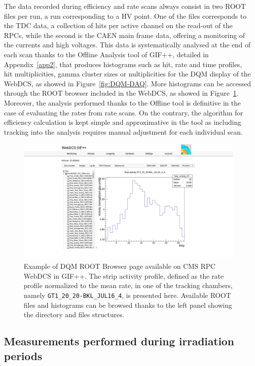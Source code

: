 	The data recorded during efficiency and rate scans always consist in two ROOT files per run, a run corresponding to a HV point. One of the files corresponds to the TDC data, a collection of hits per active channel on the read-out of the RPCs, while the second is the CAEN main frame data, offering a monitoring of the currents and high voltages. This data is systematically analysed at the end of each scan thanks to the Offline Analysis tool of GIF++, detailed in Appendix~\ref{app2}, that produces histograms such as hit, rate and time profiles, hit multiplicities, gamma cluster sizes or nultiplicities for the DQM display of the WebDCS, as showed in Figure~\ref{fig:DQM-DAQ}. More histograms can be accessed through the ROOT browser included in the WebDCS, as showed in Figure~\ref{fig:DQM-ROOT}. Moreover, the analysis performed thanks to the Offline tool is definitive in the case of evaluating the rates from rate scans. On the contrary, the algorithm for efficiency calculation is kept simple and approximative in the tool as including tracking into the analysis requires manual adjustment for each individual scan.

	\begin{figure}[H]
        \centering
		\includegraphics[width = \linewidth]{fig/chapt5/GIFpp-ROOT-browser.png}
		\caption{\label{fig:DQM-ROOT} Example of DQM ROOT Browser page available on CMS RPC WebDCS in GIF++. The strip activity profile, defined as the rate profile normalized to the mean rate, in one of the tracking chambers, namely \texttt{GT1\_20\_20-BKL\_JUL16\_4}, is presented here. Available ROOT files and histograms can be browsed thanks to the left panel showing the directory and files structures.}
	\end{figure}

	\subsection{Measurements performed during irradiation periods}
	\label{chapt5:ssec:irradiation}

